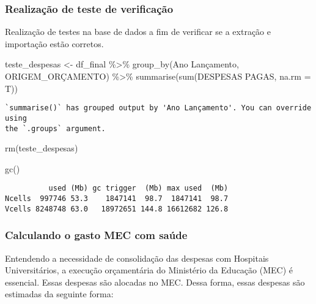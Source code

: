 \documentclass[
  letterpaper,
  DIV=11,
  numbers=noendperiod]{scrartcl}
\newenvironment{Shaded}{\begin{snugshade}}{\end{snugshade}}
\newcommand{\AttributeTok}[1]{\textcolor[rgb]{0.40,0.45,0.13}{#1}}
\newcommand{\FunctionTok}[1]{\textcolor[rgb]{0.28,0.35,0.67}{#1}}
\newcommand{\NormalTok}[1]{\textcolor[rgb]{0.00,0.23,0.31}{#1}}
\newcommand{\OtherTok}[1]{\textcolor[rgb]{0.00,0.23,0.31}{#1}}
\newcommand{\SpecialCharTok}[1]{\textcolor[rgb]{0.37,0.37,0.37}{#1}}
\newcommand{\StringTok}[1]{\textcolor[rgb]{0.13,0.47,0.30}{#1}}
\begin{document}
\hypertarget{realizauxe7uxe3o-de-teste-de-verificauxe7uxe3o}{%
\subsubsection{Realização de teste de
verificação}\label{realizauxe7uxe3o-de-teste-de-verificauxe7uxe3o}}

Realização de testes na base de dados a fim de verificar se a extração e
importação estão corretos.

\begin{Shaded}
\begin{Highlighting}[]
\NormalTok{teste\_despesas }\OtherTok{\textless{}{-}}\NormalTok{ df\_final }\SpecialCharTok{\%\textgreater{}\%} 
  \FunctionTok{group\_by}\NormalTok{(}\StringTok{\textasciigrave{}}\AttributeTok{Ano Lançamento}\StringTok{\textasciigrave{}}\NormalTok{, ORIGEM\_ORÇAMENTO) }\SpecialCharTok{\%\textgreater{}\%} 
  \FunctionTok{summarise}\NormalTok{(}\FunctionTok{sum}\NormalTok{(}\StringTok{\textasciigrave{}}\AttributeTok{DESPESAS PAGAS}\StringTok{\textasciigrave{}}\NormalTok{, }\AttributeTok{na.rm =}\NormalTok{ T))}
\end{Highlighting}
\end{Shaded}

\begin{verbatim}
`summarise()` has grouped output by 'Ano Lançamento'. You can override using
the `.groups` argument.
\end{verbatim}

\begin{Shaded}
\begin{Highlighting}[]
\FunctionTok{rm}\NormalTok{(teste\_despesas)}

\FunctionTok{gc}\NormalTok{()}
\end{Highlighting}
\end{Shaded}

\begin{verbatim}
          used (Mb) gc trigger  (Mb) max used  (Mb)
Ncells  997746 53.3    1847141  98.7  1847141  98.7
Vcells 8248748 63.0   18972651 144.8 16612682 126.8
\end{verbatim}

\hypertarget{calculando-o-gasto-mec-com-sauxfade}{%
\subsubsection{Calculando o gasto MEC com
saúde}\label{calculando-o-gasto-mec-com-sauxfade}}

Entendendo a necessidade de consolidação das despesas com Hospitais
Universitários, a execução orçamentária do Ministério da Educação (MEC)
é essencial. Essas despesas são alocadas no MEC. Dessa forma, essas
despesas são estimadas da seguinte forma:
\end{document}
